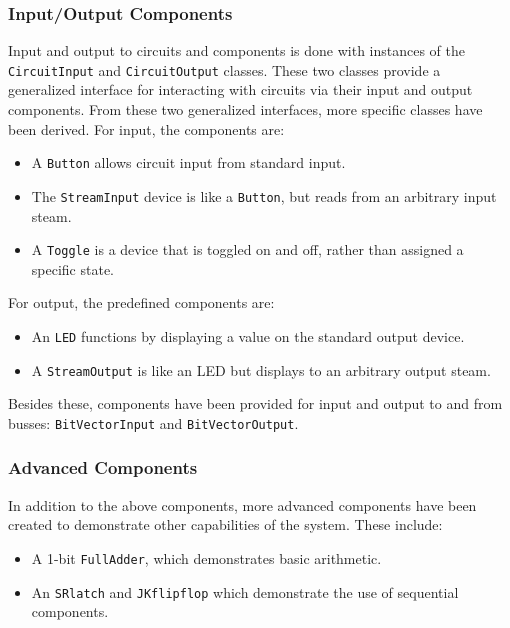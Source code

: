\documentclass{article}
\newcommand{\ClassName}[1]{\texttt{#1}}
\begin{document}
\subsubsection{Input/Output Components}

Input and output to circuits and components is done with instances of the \ClassName{CircuitInput} and \ClassName{CircuitOutput} classes. These two classes provide a generalized interface for interacting with circuits via their input and output components. From these two generalized interfaces, more specific classes have been derived. For input, the components are:

\begin{itemize}

\item A \ClassName{Button} allows circuit input from standard input.

\item The \ClassName{StreamInput} device is like a \ClassName{Button}, but reads from an arbitrary input steam.

\item A \ClassName{Toggle} is a device that is toggled on and off, rather than assigned a specific state.

\end{itemize}

For output, the predefined components are:

\begin{itemize}

\item An \ClassName{LED} functions by displaying a value on the standard output device.

\item A \ClassName{StreamOutput} is like an LED but displays to an arbitrary output steam.

\end{itemize}

Besides these, components have been provided for input and output to and from busses: \ClassName{BitVectorInput} and \ClassName{BitVectorOutput}.

\subsubsection{Advanced Components}

In addition to the above components, more advanced components have been created to demonstrate other capabilities of the system. These include:

\begin{itemize}

\item A 1-bit \ClassName{FullAdder}, which demonstrates basic arithmetic.

\item An \ClassName{SRlatch} and \ClassName{JKflipflop} which demonstrate the use of sequential components.

\end{itemize}
\end{document}
